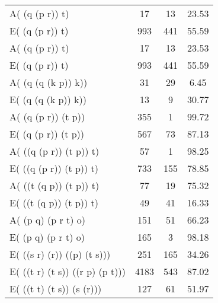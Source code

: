 \documentclass{article}
\begin{document}
\begin{figure}[p]
\begin{tabular}{|L|c|c|c|}
		A( (q \rightarrow (p \rightarrow r)) \rightarrow \neg t)                                   & 17   & 13   & 23.53 \\
		E( (q \rightarrow (p \rightarrow r)) \rightarrow \neg t)                                   & 993  & 441  & 55.59 \\
		A( (q \rightarrow (p \rightarrow r)) \rightarrow \neg t)                                   & 17   & 13   & 23.53 \\
		E( (q \rightarrow (p \rightarrow r)) \rightarrow \neg t)                                   & 993  & 441  & 55.59 \\
		A( (q \rightarrow  (q \wedge  (k \rightarrow p)) \rightarrow k))                           & 31   & 29   & 6.45  \\
		E( (q \rightarrow  (q \wedge  (k \rightarrow p)) \rightarrow k))                           & 13   & 9    & 30.77 \\
		A( (q \rightarrow (p \vee  r)) \rightarrow \neg (t \vee p))                                & 355  & 1    & 99.72 \\
		E( (q \rightarrow (p \vee  r)) \rightarrow \neg (t \vee p))                                & 567  & 73   & 87.13 \\
		A( ((q \rightarrow (p \vee  r)) \wedge  (t \rightarrow p)) \rightarrow t)                  & 57   & 1    & 98.25 \\
		E( ((q \rightarrow (p \vee  r)) \wedge  (t \rightarrow p)) \rightarrow t)                  & 733  & 155  & 78.85 \\
		A( ((\neg t \rightarrow (q \wedge p)) \wedge  (t \rightarrow p)) \rightarrow t)            & 77   & 19   & 75.32 \\
		E( ((\neg t \rightarrow (q \wedge p)) \wedge  (t \rightarrow p)) \rightarrow t)            & 49   & 41   & 16.33 \\
		A( (\neg p \wedge  q) \rightarrow (p \vee r \rightarrow t) \rightarrow o)                  & 151  & 51   & 66.23 \\
		E( (\neg p \wedge  q) \rightarrow (p \vee r \rightarrow t) \rightarrow o)                  & 165  & 3    & 98.18 \\
		E( ((s \vee r) \vee (\bot \vee r)) \wedge ((\bot \vee p) \vee (t \rightarrow  s)))         & 251  & 165  & 34.26 \\
		E( ((t \wedge   r) \vee (t \wedge  s)) \wedge  ((r \wedge  p) \wedge (p \rightarrow  t)))  & 4183 & 543  & 87.02 \\
		E( ((t \wedge  t) \vee (t \rightarrow  s)) \wedge  (\neg s \wedge  (\bot \rightarrow  r))) & 127  & 61   & 51.97 \\

\end{tabular}
\end{figure}
\end{document}
